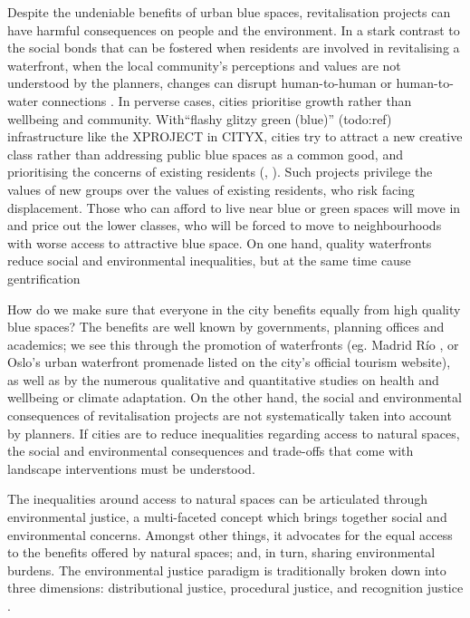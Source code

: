 \documentclass{article}
\begin{document}
Despite the undeniable benefits of urban blue spaces, revitalisation projects can have harmful consequences on people and the environment.
In a stark contrast to the social bonds that can be fostered when residents are involved in revitalising a waterfront, when the local community's perceptions and values are not understood by the planners, changes can disrupt human-to-human or human-to-water connections \parencite{toomey2021place}. In perverse cases, cities prioritise growth rather than wellbeing and community. With``flashy glitzy green (blue)'' (todo:ref) infrastructure like the XPROJECT in CITYX, cities try to attract a new creative class rather than addressing public blue spaces as a common good, and prioritising the concerns of existing residents (\cite{wessells2014urban}, \cite{anguelovski2020expanding}). 
Such projects privilege the values of new groups over the values of existing residents, who risk facing displacement. Those who can afford to live near blue or green spaces will move in and price out the lower classes, who will be forced to move to neighbourhoods with worse access to attractive blue space. On one hand, quality waterfronts reduce social and environmental inequalities, but at the same time cause gentrification \parencite{todo:REF OF GENTRIFICATION PAPER}

How do we make sure that everyone in the city benefits equally from high quality blue spaces? The benefits are well known by governments, planning offices and academics; we see this through the promotion of waterfronts (eg. Madrid Río \parencite{madridrio}, or Oslo's urban waterfront promenade \parencite{visitoslo} listed on the city's official tourism website), as well as by the numerous qualitative and quantitative studies on health and wellbeing or climate adaptation.
On the other hand, the social and environmental consequences of revitalisation projects are not systematically taken into account by planners. If cities are to reduce inequalities regarding access to natural spaces, the social and environmental consequences and trade-offs that come with landscape interventions must be understood.

The inequalities around access to natural spaces can be articulated through environmental justice, a multi-faceted concept which brings together social and environmental concerns. Amongst other things, it advocates for the equal access to the benefits offered by natural spaces; and, in turn, sharing environmental burdens. The environmental justice paradigm is traditionally broken down into three dimensions: distributional justice, procedural justice, and recognition justice \parencite{todo:cite schlosberg}.
\end{document}
